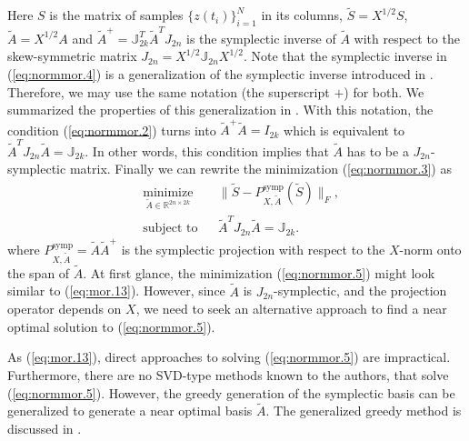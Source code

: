Here $S$ is the matrix of samples $\{ z(t_i) \}_{i=1}^{N}$ in its columns, $\tilde S = X^{1/2} S$, $\tilde A = X^{1/2} A$ and $\tilde A^+ = \mathbb J_{2k}^T \tilde A^T J_{2n}$ is the symplectic inverse of $\tilde A$ with respect to the skew-symmetric matrix $J_{2n} = X^{1/2} \mathbb J_{2n} X^{1/2}$. Note that the symplectic inverse in (\ref{eq:normmor.4}) is a generalization of the symplectic inverse introduced in . Therefore, we may use the same notation (the superscript $+$) for both. We summarized the properties of this generalization in . With this notation, the condition (\ref{eq:normmor.2}) turns into $\tilde A ^+ \tilde A = I_{2k}$ which is equivalent to $\tilde A ^T J_{2n} \tilde A = \mathbb J_{2k}$. In other words, this condition implies that $\tilde A$ has to be a $J_{2n}$-symplectic matrix. Finally we can rewrite the minimization (\ref{eq:normmor.3}) as
\begin{equation} \label{eq:normmor.5}
\begin{aligned}
& \underset{\tilde A\in \mathbb{R}^{2n\times 2k}}{\text{minimize}}
& & \| \tilde S - P^\text{symp}_{X,\tilde A}(\tilde S) \|_F, \\
& \text{subject to}
& & \tilde A^T J_{2n} \tilde A = \mathbb J_{2k}.
\end{aligned}
\end{equation}
where $P^\text{symp}_{X,\tilde A} = \tilde A \tilde A^+$ is the symplectic projection with respect to the $X$-norm onto the span of $\tilde A$. At first glance, the minimization (\ref{eq:normmor.5}) might look similar to (\ref{eq:mor.13}). However, since $\tilde A$ is $J_{2n}$-symplectic, and the projection operator depends on $X$, we need to seek an alternative approach to find a near optimal solution to (\ref{eq:normmor.5}). 

As (\ref{eq:mor.13}), direct approaches to solving (\ref{eq:normmor.5}) are impractical. Furthermore, there are no SVD-type methods known to the authors, that solve (\ref{eq:normmor.5}). However, the greedy generation of the symplectic basis can be generalized to generate a near optimal basis $\tilde A$. The generalized greedy method is discussed in .

